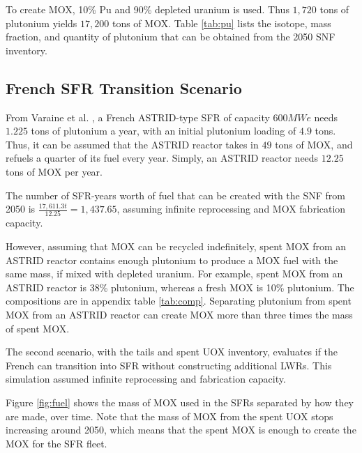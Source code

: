 To create \gls{MOX}, 10\% Pu and 90\% depleted uranium is used.
Thus $1,720$ tons of plutonium yields $17,200$ tons of
\gls{MOX}. Table \ref{tab:pu} lists the isotope, mass fraction,
and quantity of plutonium that can be obtained from the 2050 \gls{SNF} inventory.


\subsection{French \gls{SFR} Transition Scenario}

From Varaine et al. \cite{marsaultmarie-sophie_pre-conceptual_2012}, a French
ASTRID-type \gls{SFR} of capacity $600 MWe$ needs $1.225$ tons of
plutonium a year, with an initial plutonium loading of $4.9$ tons.
Thus, it can be assumed that the ASTRID reactor takes in $49$ tons of 
\gls{MOX}, and refuels a quarter of its fuel every year. Simply,
an ASTRID reactor needs $12.25$ tons of \gls{MOX} per year. 

The number of SFR-years worth of fuel that can be created with
the \gls{SNF} from 2050 is $\frac{17,611.3 t}{12.25} = 1,437.65 $,
assuming infinite reprocessing and \gls{MOX} fabrication capacity.

However, assuming that \gls{MOX} can be recycled indefinitely,
spent \gls{MOX} from an ASTRID reactor
contains enough plutonium to produce a \gls{MOX} fuel with
the same mass, if mixed with depleted uranium. For example,
spent \gls{MOX} from an ASTRID reactor is 38\% plutonium,
whereas a fresh \gls{MOX} is 10\% plutonium.
The compositions are in appendix table \ref{tab:comp}.
Separating plutonium from spent \gls{MOX} from
an ASTRID reactor can create \gls{MOX} more than
three times the mass of spent \gls{MOX}.

The second scenario, with the tails and spent \gls{UOX}
inventory, evaluates if the French can transition into \gls{SFR}
without constructing additional \gls{LWR}s. This simulation
assumed infinite reprocessing and fabrication capacity.

Figure \ref{fig:fuel} shows the mass of \gls{MOX} used in the 
\gls{SFR}s separated by how they are made, over time.
Note that the mass of \gls{MOX} from the spent \gls{UOX}
stops increasing around 2050, which means that the spent
\gls{MOX} is enough to create the \gls{MOX} for the
\gls{SFR} fleet. 

